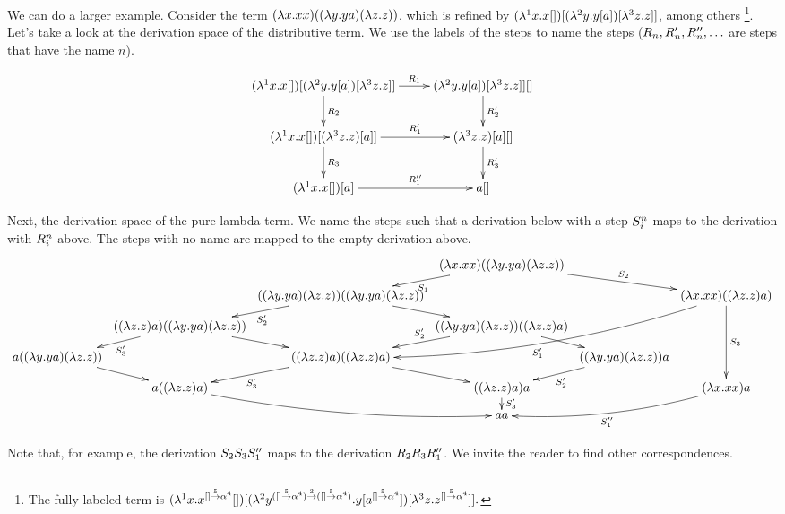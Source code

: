 \begin{example}
We can do a larger example. Consider the term
$(\lambda x. x x) ((\lambda y. y a) (\lambda z. z))$,
which is refined by
$(\lambda^{1} x. x []) [(\lambda^{2} y. y [a]) [\lambda^{3} z. z]]$, among others
\footnote{
The fully labeled term is
$
  (\lambda^{1} x. x^{[] \overset{5}{\to} \alpha^4} [])
    [(\lambda^{2} 
      y^{([] \overset{5}{\to} \alpha^4) \overset{3}{\to} ([] \overset{5}{\to} \alpha^4)}
      . y [a^{[] \overset{5}{\to} \alpha^4}])
        [\lambda^{3} z. z^{[] \overset{5}{\to} \alpha^4}]
    ].
$
}.
Let's take a look at the derivation space of the distributive term. We use the labels of the
steps to name the steps ($R_n, R_n', R_n'', \hdots$ are steps that have the name $n$).

\[
  \xymatrix{
  (\lamp{1}{\var}{\var []}) [(\lamp{2}{\vartwo}{\vartwo [a]}) [\lamp{3}{\varthree}{\varthree}]]
  \ar[r]^-{\redex_1}
  \ar[d]^-{\redex_2}
  &
  (\lamp{2}{\vartwo}{\vartwo [a]}) [\lamp{3}{\varthree}{\varthree}]] []
  \ar[d]^-{\redex_2'}
  \\
  (\lamp{1}{\var}{\var []}) [(\lamp{3}{\varthree}{\varthree}) [a]]
  \ar[r]^-{\redex_1'}
  \ar[d]^-{\redex_3}
  &
  (\lamp{3}{\varthree}{\varthree}) [a] []
  \ar[d]^-{\redex_3'}
  \\
  (\lamp{1}{\var}{\var []}) [a]
  \ar[r]^-{\redex_1''}
  &
  a []
  }
\]

Next, the derivation space of the pure lambda term.
We name the steps such that a derivation below with a step $S_i^n$ maps to
the derivation with $R_i^n$ above. The steps with no name are mapped to the empty
derivation above.
{\tiny
\[
\xymatrix@R=.3cm@C=.1cm{
  &
  &
  & (\lam{\var}{\var \var})((\lam{\vartwo}{\vartwo a}) (\lam{\varthree}{\varthree}))
  \ar[dl]^-{\redextwo_1}
  \ar[drr]^-{\redextwo_2}
  &
  &
  \\
  &
  & ((\lam{\vartwo}{\vartwo a}) (\lam{\varthree}{\varthree})) ((\lam{\vartwo}{\vartwo a}) (\lam{\varthree}{\varthree}))
  \ar[dl]^-{\redextwo_2'}
  \ar[dr]
  &
  &
  & (\lam{\var}{\var \var}) ((\lam{\varthree}{\varthree}) a)
  \ar[ddd]^-{\redextwo_3}
  \ar@/^.5cm/[ddlll]^{\redextwo_1'}
  \\
  & ((\lam{\varthree}{\varthree}) a) ((\lam{\vartwo}{\vartwo a}) (\lam{\varthree}{\varthree}))
  \ar[dl]^-{\redextwo_3'}
  \ar[dr]
  &
  & ((\lam{\vartwo}{\vartwo a}) (\lam{\varthree}{\varthree})) ((\lam{\varthree}{\varthree}) a)
  \ar[dl]_-{\redextwo_2'}
  \ar[dr]
  &
  &
  \\
  a ((\lam{\vartwo}{\vartwo a}) (\lam{\varthree}{\varthree}))
  \ar[dr]
  &
  & ((\lam{\varthree}{\varthree}) a) ((\lam{\varthree}{\varthree}) a)
  \ar[dl]^-{\redextwo_3'}
  \ar[dr]
  &
  & ((\lam{\vartwo}{\vartwo a}) (\lam{\varthree}{\varthree})) a
  \ar[dl]^-{\redextwo_2'}
  &
  \\
  & a ((\lam{\varthree}{\varthree}) a)
  \ar@/_.3cm/[drr]
  &
  & ((\lam{\varthree}{\varthree}) a) a
  \ar[d]^-{\redextwo_3'}
  &
  & (\lam{\var}{\var \var}) a
  \ar@/^.3cm/[dll]^-{\redextwo_1''}
  \\
  &
  &
  & a a
  &
  &
  \\
}
\]
}

Note that, for example, the derivation $S_2 S_3 S_1''$ maps to
the derivation $R_2 R_3 R_1''$.
We invite the reader to find other correspondences.
\end{example}
